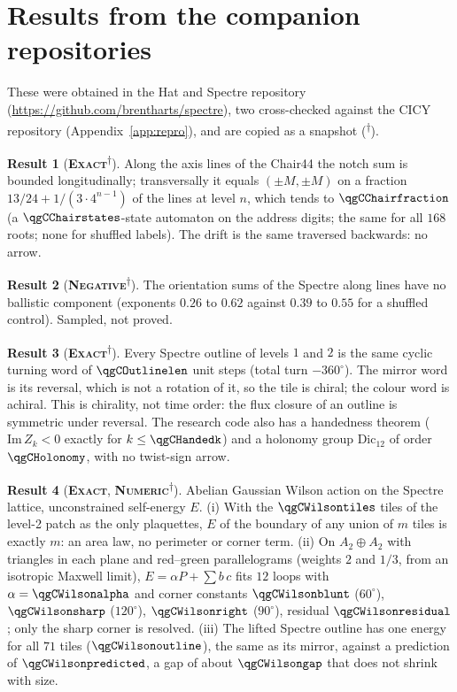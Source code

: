 \documentclass[11pt]{article}
\newcommand{\exact}{\textbf{\textsc{Exact}}}
\newcommand{\numeric}{\textbf{\textsc{Numeric}}}
\newcommand{\negres}{\textbf{\textsc{Negative}}}
\newcommand{\snap}{\textsuperscript{$\dagger$}}      %
\theoremstyle{definition}
\newtheorem{result}{Result}
\begin{document}
\section{Results from the companion repositories}\label{sec:companion}
These were obtained in the Hat and Spectre repository (\url{https://github.com/brentharts/spectre}), two cross-checked against the CICY repository (Appendix~\ref{app:repro}), and are copied as a snapshot (\snap).
\begin{result}[\exact\snap]\label{res:chair-pol}
Along the axis lines of the Chair44 the notch sum is bounded longitudinally; transversally it equals $(\pm M,\pm M)$ on a fraction $13/24+1/(3\cdot 4^{n-1})$ of the lines at level $n$, which tends to $\qgCChairfraction$ (a $\qgCChairstates$-state automaton on the address digits; the same for all $168$ roots; none for shuffled labels). The drift is the same traversed backwards: no arrow.
\end{result}
\begin{result}[\negres\snap]\label{res:spectre-lines}
The orientation sums of the Spectre along lines have no ballistic component (exponents $0.26$ to $0.62$ against $0.39$ to $0.55$ for a shuffled control). Sampled, not proved.
\end{result}
\begin{result}[\exact\snap]\label{res:chirality}
Every Spectre outline of levels $1$ and $2$ is the same cyclic turning word of $\qgCOutlinelen$ unit steps (total turn $-360^\circ$). The mirror word is its reversal, which is not a rotation of it, so the tile is chiral; the colour word is achiral. This is chirality, not time order: the flux closure of an outline is symmetric under reversal. The research code also has a handedness theorem ($\mathrm{Im}\,Z_k<0$ exactly for $k\le\qgCHandedk$) and a holonomy group $\mathrm{Dic}_{12}$ of order $\qgCHolonomy$, with no twist-sign arrow.
\end{result}
\begin{result}[\exact, \numeric\snap]\label{res:wilson-hex}
Abelian Gaussian Wilson action on the Spectre lattice, unconstrained self-energy $E$. (i) With the $\qgCWilsontiles$ tiles of the level-2 patch as the only plaquettes, $E$ of the boundary of any union of $m$ tiles is exactly $m$: an area law, no perimeter or corner term. (ii) On $A_2\oplus A_2$ with triangles in each plane and red--green parallelograms (weights $2$ and $1/3$, from an isotropic Maxwell limit), $E=\alpha P+\sum b\,c$ fits $12$ loops with $\alpha=\qgCWilsonalpha$ and corner constants $\qgCWilsonblunt$ ($60^\circ$), $\qgCWilsonsharp$ ($120^\circ$), $\qgCWilsonright$ ($90^\circ$), residual $\qgCWilsonresidual$; only the sharp corner is resolved. (iii) The lifted Spectre outline has one energy for all $71$ tiles ($\qgCWilsonoutline$), the same as its mirror, against a prediction of $\qgCWilsonpredicted$, a gap of about $\qgCWilsongap$ that does not shrink with size.
\end{result}
\end{document}
